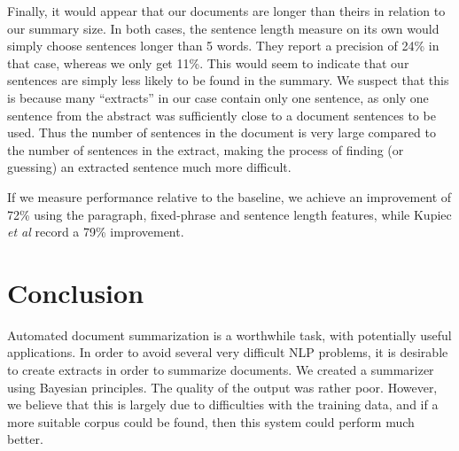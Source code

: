\documentclass[a4paper, 10pt]{article}
\begin{document}
Finally, it would appear that our documents are longer than theirs in relation to our summary size. In both cases, the sentence length measure on its own would simply choose sentences longer than 5 words. They report a precision of 24\% in that case, whereas we only get 11\%. This would seem to indicate that our sentences are simply less likely to be found in the summary. We suspect that this is because many ``extracts'' in our case contain only one sentence, as only one sentence from the abstract was sufficiently close to a document sentences to be used. Thus the number of sentences in the document is very large compared to the number of sentences in the extract, making the process of finding (or guessing) an extracted sentence much more difficult.

If we measure performance relative to the baseline, we achieve an improvement of 72\% using the paragraph, fixed-phrase and sentence length features, while Kupiec {\it et al} record a 79\% improvement.

\section{Conclusion}
Automated document summarization is a worthwhile task, with potentially useful applications. In order to avoid several very difficult NLP problems, it is desirable to create extracts in order to summarize documents. We created a summarizer using Bayesian principles. The quality of the output was rather poor. However, we believe that this is largely due to difficulties with the training data, and if a more suitable corpus could be found, then this system could perform much better.



\end{document}
